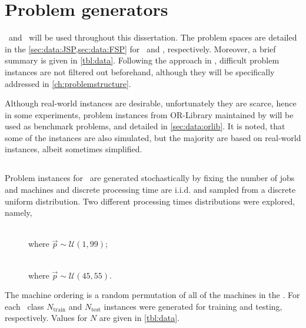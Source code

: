 
\chapter{Problem generators}\label{ch:genprobleminstances} 

 \JSP\ and \FSP\  will be used  throughout this dissertation. The  problem spaces are detailed in the \cref{sec:data:JSP,sec:data:FSP} for \JSP\ and \FSP, respectively. Moreover, a brief summary is given in \cref{tbl:data}.
Following the approach in \citet{Whitley}, difficult problem instances are not filtered out beforehand, although they will be specifically addressed in \cref{ch:problemstructure}. 

Although real-world instances are desirable, unfortunately they are scarce, hence in some experiments, problem instances from OR-Library maintained by \citet{ORlibrary} will be used as benchmark problems, and detailed in \cref{sec:data:orlib}. It is noted, that some of the instances are also simulated, but the majority are based on real-world instances, albeit sometimes simplified. 

\section{\Jsp}\label{sec:data:JSP}
Problem instances for \JSP\ are generated stochastically by fixing the number of jobs and machines and 
discrete processing time are i.i.d. and sampled from a discrete uniform distribution. %
Two different processing times distributions were explored, namely,
\begin{description}
	\item[\Jrnd]  \hfill \\ where $\vec{p}\sim\mathcal{U}(1,99)$;
	\item[\Jrndn]  \hfill \\ where $\vec{p}\sim\mathcal{U}(45,55)$.
\end{description}
The machine ordering is a random permutation of all of the machines in the \jsp. 
For each \JSP\ class $N_{\text{train}}$  and $N_{\text{test}}$ instances were generated for training and testing, respectively. Values for $N$ are given in \cref{tbl:data}. 

